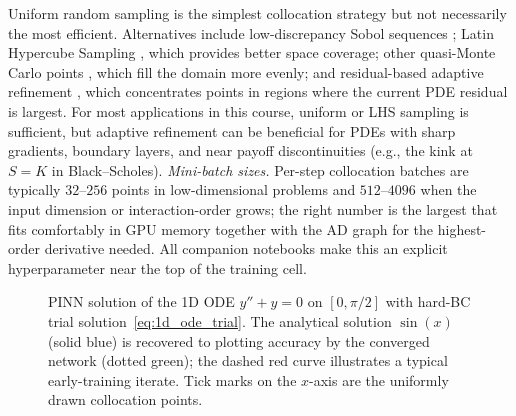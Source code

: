\documentclass[11pt,a4paper]{report}
\begin{document}
\begin{remarkbox}
Uniform random sampling is the simplest collocation strategy but not necessarily the most efficient.  Alternatives include low-discrepancy Sobol sequences \citep{sobol1967distribution}; Latin Hypercube Sampling \citep[LHS;][]{mckay1979comparison}, which provides better space coverage; other quasi-Monte Carlo points \citep{niederreiter1992random, owen1995randomly}, which fill the domain more evenly; and residual-based adaptive refinement \citep[RAR;][]{lu2021deepxde}, which concentrates points in regions where the current PDE residual is largest.  For most applications in this course, uniform or LHS sampling is sufficient, but adaptive refinement can be beneficial for PDEs with sharp gradients, boundary layers, and near payoff discontinuities (e.g., the kink at $S = K$ in Black--Scholes).  \emph{Mini-batch sizes.}  Per-step collocation batches are typically $32$--$256$ points in low-dimensional problems and $512$--$4096$ when the input dimension or interaction-order grows; the right number is the largest that fits comfortably in GPU memory together with the AD graph for the highest-order derivative needed.  All companion notebooks make this an explicit hyperparameter near the top of the training cell.
\end{remarkbox}

\begin{figure}[ht]
\centering
{}
\caption{PINN solution of the 1D ODE $y''+y=0$ on $[0,\pi/2]$ with hard-BC trial solution~\eqref{eq:1d_ode_trial}. The analytical solution $\sin(x)$ (solid blue) is recovered to plotting accuracy by the converged network (dotted green); the dashed red curve illustrates a typical early-training iterate. Tick marks on the $x$-axis are the uniformly drawn collocation points.}
\label{fig:pinn_1d_ode}
\end{figure}
\end{document}
